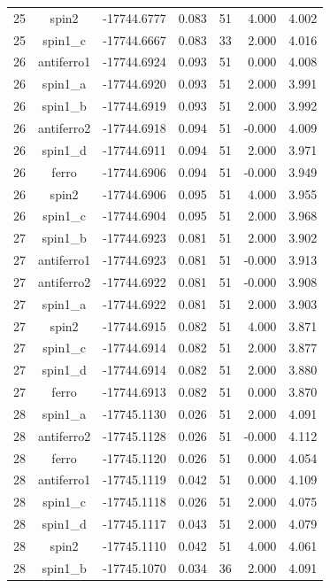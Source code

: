 \begin{longtable}{@{}ccrrrrr@{}}
25 & spin2 & -17744.6777 & 0.083 & 51 & 4.000 & 4.002 \\
25 & spin1\_c & -17744.6667 & 0.083 & 33 & 2.000 & 4.016 \\
\rowcolor{gray!20} 26 & antiferro1 & -17744.6924 & 0.093 & 51 & 0.000 & 4.008 \\
26 & spin1\_a & -17744.6920 & 0.093 & 51 & 2.000 & 3.991 \\
26 & spin1\_b & -17744.6919 & 0.093 & 51 & 2.000 & 3.992 \\
26 & antiferro2 & -17744.6918 & 0.094 & 51 & -0.000 & 4.009 \\
26 & spin1\_d & -17744.6911 & 0.094 & 51 & 2.000 & 3.971 \\
26 & ferro & -17744.6906 & 0.094 & 51 & -0.000 & 3.949 \\
26 & spin2 & -17744.6906 & 0.095 & 51 & 4.000 & 3.955 \\
26 & spin1\_c & -17744.6904 & 0.095 & 51 & 2.000 & 3.968 \\
\rowcolor{gray!20} 27 & spin1\_b & -17744.6923 & 0.081 & 51 & 2.000 & 3.902 \\
27 & antiferro1 & -17744.6923 & 0.081 & 51 & -0.000 & 3.913 \\
27 & antiferro2 & -17744.6922 & 0.081 & 51 & -0.000 & 3.908 \\
27 & spin1\_a & -17744.6922 & 0.081 & 51 & 2.000 & 3.903 \\
27 & spin2 & -17744.6915 & 0.082 & 51 & 4.000 & 3.871 \\
27 & spin1\_c & -17744.6914 & 0.082 & 51 & 2.000 & 3.877 \\
27 & spin1\_d & -17744.6914 & 0.082 & 51 & 2.000 & 3.880 \\
27 & ferro & -17744.6913 & 0.082 & 51 & 0.000 & 3.870 \\
\rowcolor{gray!20} 28 & spin1\_a & -17745.1130 & 0.026 & 51 & 2.000 & 4.091 \\
28 & antiferro2 & -17745.1128 & 0.026 & 51 & -0.000 & 4.112 \\
28 & ferro & -17745.1120 & 0.026 & 51 & 0.000 & 4.054 \\
28 & antiferro1 & -17745.1119 & 0.042 & 51 & 0.000 & 4.109 \\
28 & spin1\_c & -17745.1118 & 0.026 & 51 & 2.000 & 4.075 \\
28 & spin1\_d & -17745.1117 & 0.043 & 51 & 2.000 & 4.079 \\
28 & spin2 & -17745.1110 & 0.042 & 51 & 4.000 & 4.061 \\
28 & spin1\_b & -17745.1070 & 0.034 & 36 & 2.000 & 4.091 \\

\end{longtable}
